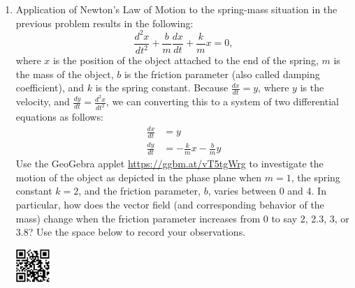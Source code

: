 \begin{enumerate}
\item	Application of Newton's Law of Motion to the spring-mass situation in the previous problem results in the following: 
\[\frac{d^2x}{dt^2}+\frac{b}{m}\frac{dx}{dt}+\frac{k}{m}x=0,\]
where $x$ is the position of the object attached to the end of the spring, $m$ is the mass of the object, $b$ is the friction parameter (also called damping coefficient), and $k$ is the spring constant. Because $\frac{dx}{dt} = y$, where $y$ is the velocity, and $\frac{dy}{dt} = \frac{d^2x}{dt^2}$, we can converting this to a system of two differential equations as follows:  \label{10problem3}
\begin{align*}
\frac{dx}{dt}&=y\\
\frac{dy}{dt}&= -\frac{k}{m}x-\frac{b}{m}y
\end{align*}
Use the GeoGebra applet \href{https://ggbm.at/vT5tgWrg}{\underline{https://ggbm.at/vT5tgWrg}} to investigate the motion of the object as depicted in the phase plane when $m = 1$, the spring constant $k = 2$, and the friction parameter, $b$, varies between 0 and 4. In particular, how does the vector field (and corresponding behavior of the mass) change when the friction parameter increases from 0 to say 2, 2.3, 3, or 3.8? Use the space below to record your observations.

\vspace{-1in}\hspace{-0.6in}\includegraphics[width=0.5in]{10/10SpringMassExplorationQR.png} \\


\end{enumerate}
